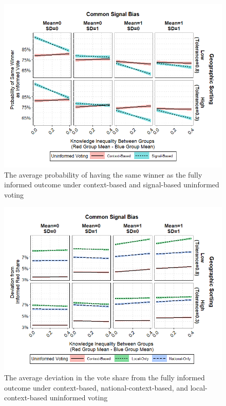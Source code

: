 \begin{figure}[ht!!!]
    \caption{The average probability of having the same winner as the fully informed outcome under context-based and signal-based uninformed voting}
    \label{fig:abmres2}
    \includegraphics[width=\linewidth]{../outputs/abmres2.png}
\end{figure}

\begin{figure}[ht!!!]
    \caption{The average deviation in the vote share from the fully informed outcome under context-based, national-context-based, and local-context-based uninformed voting}
    \label{fig:abmres1c}
    \includegraphics[width=\linewidth]{../outputs/abmres1c.png}
\end{figure}


